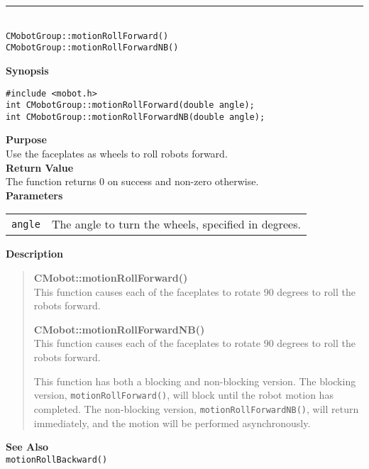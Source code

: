 \noindent
\vspace{5pt}
\rule{4.5in}{0.015in}\\
\noindent
{\LARGE \texttt{CMobotGroup::motionRollForward()}}\\
{\LARGE \texttt{CMobotGroup::motionRollForwardNB()}}\\
{}

\noindent
{\bf Synopsis}
\vspace{-8pt}
\begin{verbatim}
#include <mobot.h>
int CMobotGroup::motionRollForward(double angle);
int CMobotGroup::motionRollForwardNB(double angle);
\end{verbatim}

\noindent
{\bf Purpose}\\
Use the faceplates as wheels to roll robots forward.\\

\noindent
{\bf Return Value}\\
The function returns 0 on success and non-zero otherwise.\\

\noindent
{\bf Parameters}\\
\vspace{-0.1in}
\begin{description}
\item               
\begin{tabular}{p{15 mm}p{145 mm}}
\texttt{angle} & The angle to turn the wheels, specified in degrees.\\
\end{tabular}
\end{description}

\noindent
{\bf Description}\\
\vspace{-12pt}
\begin{quote}
{\bf CMobot::motionRollForward()}\\
This function causes each of the faceplates to rotate 90 degrees to roll the
robots forward.

{\bf CMobot::motionRollForwardNB()}\\
This function causes each of the faceplates to rotate 90 degrees to roll the
robots forward.

This function has both a blocking and non-blocking version.
The blocking version, \texttt{motionRollForward()}, will block until the
robot motion has completed. The non-blocking version, \texttt{motionRollForwardNB()},
will return immediately, and the motion will be performed asynchronously.\\
\end{quote}

\noindent
{\bf See Also}\\
\texttt{motionRollBackward()}

